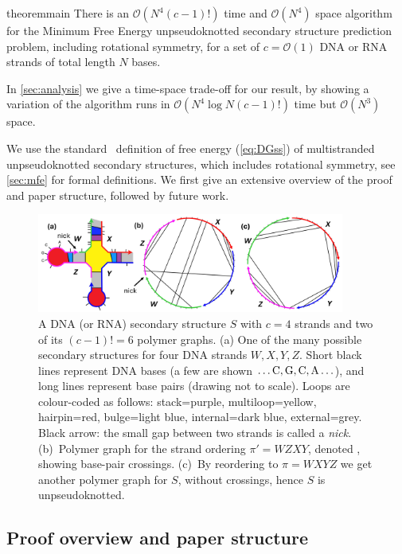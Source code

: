 \begin{restatable}{theorem}{main} 
	\label{thm:main}
	There is an $\mathcal{O}(N^4(c-1)!)$ time and $\mathcal{O}(N^4)$ space algorithm for the 
	Minimum Free Energy unpseudoknotted secondary structure prediction problem, including rotational symmetry, 
	for a set of $c = \mathcal{O}(1)$ DNA or RNA strands of  total length  $N$ bases. 
\end{restatable}

In \cref{sec:analysis} we give a time-space trade-off for our result, by showing a variation of the algorithm runs in $\mathcal{O}(N^4 \log N (c-1)!)$ time but $\mathcal{O}(N^3)$ space.  


We use the standard~\cite{dirks2007thermodynamic} definition of free energy (\cref{eq:DGss}) of multistranded unpseudoknotted secondary structures, which includes rotational symmetry, see \cref{sec:mfe} for formal definitions.  
We first give an extensive overview of the proof and paper structure, followed by future work. 


\begin{figure}[t]
	\centering\includegraphics[width=0.9\textwidth]{figures/ss.jpg}
	\caption{
		A  DNA (or RNA) secondary structure $S$ with $c=4$ strands and two of its $(c-1)!=6$ polymer graphs. 
		(a) One of the many possible secondary structures for four DNA strands $W,X,Y,Z$. 
		Short black lines represent DNA bases (a few are shown $\ldots \mathrm{C}, \mathrm{G}, \mathrm{C}, \mathrm{A} \ldots$), and long lines represent base pairs (drawing not to scale). 
		Loops are colour-coded as follows:  stack=purple, multiloop=yellow, hairpin=red, bulge=light blue, internal=dark blue, external=grey.    
		Black arrow: the small gap between two strands is called a {\em nick}. 
		(b)~Polymer graph for the strand ordering $\pi' = WZXY$, denoted \PolySpiPrime, showing base-pair crossings.
		(c)~By  reordering to $\pi = WXYZ$ we get another polymer graph \PolySpi for $S$, without crossings, hence  $S$ is unpseudoknotted. 
	}
	\label{fig:sec struct}
	
\end{figure}

\subsection{Proof overview and paper structure}\label{sec:intuition}

